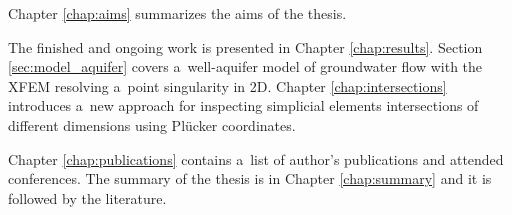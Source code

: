 \documentclass[bibliography=totocnumbered,dvipsnames,FM,Dis]{tulthesis_autoreferat}
\begin{document}
Chapter \ref{chap:aims} summarizes the aims of the thesis.

The finished and ongoing work is presented in Chapter \ref{chap:results}. Section \ref{sec:model_aquifer} 
covers a~well-aquifer model of groundwater flow with the XFEM resolving a~point singularity in 2D.
Chapter \ref{chap:intersections} introduces a~new approach for inspecting simplicial elements intersections
of different dimensions using Pl{\"u}cker coordinates.

Chapter \ref{chap:publications} contains a~list of author's publications and attended conferences.
The summary of the thesis is in Chapter \ref{chap:summary} and it is followed by the literature.



% 
% 
% 
% 
% 
% 
% 
% 
% 
% 
% 
% 
% 
% 
% 
% 
% 
% 
\end{document}
